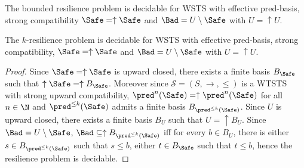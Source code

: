 \begin{corollary}\label{B-up-up}
The bounded resilience problem is decidable for WSTS with effective pred-basis,
strong compatibility
 $\Safe=\uparrow \Safe$
and $\Bad=U \setminus \Safe$ with $U = \uparrow U$.
\end{corollary}


\begin{theorem}\label{k-up-up}
The %
$k$-resilience problem is decidable for WSTS with effective pred-basis, strong %
compatibility, $\Safe=\uparrow \Safe$
and $\Bad=U \setminus \Safe$  with $U = \uparrow U$.
\end{theorem}

\begin{proof}
Since $\Safe=\uparrow \Safe$ is upward closed, there exists a finite basis $B_{ \Safe}$ such that $\uparrow \Safe = \uparrow B_{\Safe}$. 
Moreover since $\mathscr{S}=(S,\rightarrow,\leq)$ is a WTSTS with strong upward compatibility,  $\pred^n(\Safe)=\uparrow \pred^n(\Safe)$ for all $n\in \N$ and $\pred^{\leq k}(\Safe)$ admits a finite basis $B_{\pred^{\leq k}(\Safe)}$. %
Since $U$  is upward closed, there exists a finite basis $B_{U}$ such that $U = \uparrow B_{U}$. %
Since $\Bad = U \setminus \Safe$, $\Bad \subseteq \uparrow B_{\pred^{\leq k}(\Safe)}$ iff for every $b \in B_{U}$, there is either $s \in B_{\pred^{\leq k}(\Safe)}$ such that $s \leq b$, either $t \in B_{\Safe}$ such that $t\leq b$,
hence the resilience problem is decidable.
\end{proof}









